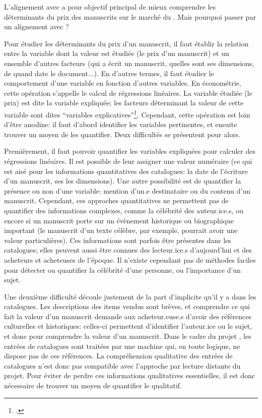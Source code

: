 L'alignement avec \wkd{} a pour objectif principal de mieux comprendre les déterminants du prix des manuscrits sur le marché du . Mais pourquoi passer par un alignement avec \wkd{}? 

Pour étudier les déterminants du prix d'un manuscrit, il faut établir la relation entre la variable dont la valeur est étudiée (le prix d'un manuscrit) et un ensemble d'autres facteurs (qui a écrit un manuscrit, quelles sont ses dimensions, de quand date le document...). En d'autres termes, il faut étudier le comportement d'une variable en fonction d'autres variables. En économétrie, cette opération s'appelle le calcul de régressions linéaires. La variable étudiée (le prix) est dite la variable expliquée; les facteurs déterminant la valeur de cette variable sont dites \enquote{variables explicatives}\footcite{noauthor_regression_2022}. Cependant, cette opération est loin d'être anodine: il faut d'abord identifier les variables pertinentes, et ensuite trouver un moyen de les quantifier. Deux difficultés se présentent pour alors.

Premièrement, il faut pouvoir quantifier les variables expliquées pour calculer des régressions linéaires. Il est possible de leur assigner une valeur numéraire (ce qui est aisé pour les informations quantitatives des catalogues: la date de l'écriture d'un manuscrit, ses les dimensions). Une autre possibilité est de quantifier la présence ou non d'une variable: mention d'un.e destinataire ou du contenu d'un manuscrit. Cependant, ces approches quantitatives ne permettent pas de quantifier des informations complexes, comme la célébrité des auteur.ice.s, ou encore si un manuscrit porte sur un évènement historique ou biographique important (le manuscrit d'un texte célèbre, par exemple, pourrait avoir une valeur particulières). Ces informations sont parfois être présentes dans les catalogues; elles peuvent aussi être connues des lecteur.ice.s d'aujourd'hui et des acheteurs et acheteuses de l'époque. Il n'existe cependant pas de méthodes faciles pour détecter ou quantifier la célébrité d'une personne, ou l'importance d'un sujet.

Une deuxième difficulté découle justement de la part d'implicite qu'il y a dans les catalogues. Les descriptions des items vendus sont brèves, et comprendre ce qui fait la valeur d'un manuscrit demande aux acheteur.euse.s d'avoir des références culturelles et historiques: celles-ci permettent d'identifier l'auteur.ice ou le sujet, et donc pour comprendre la valeur d'un manuscrit. Dans le cadre du projet \mssktb{}, les entrées de catalogues sont traitées par une machine qui, en toute logique, ne dispose pas de ces références. La compréhension qualitative des entrées de catalogues n'est donc pas compatible avec l'approche par lecture distante du projet. Pour éviter de perdre ces informations qualitatives essentielles, il est donc nécessaire de trouver un moyen de quantifier le qualitatif.

